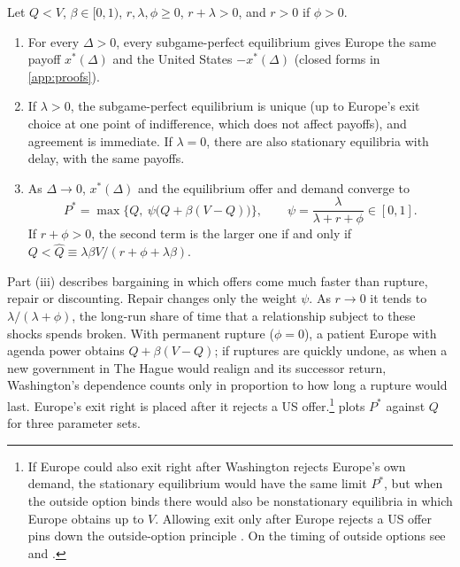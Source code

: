 \begin{proposition}\label{prop:master}
Let $Q<V$, $\beta\in[0,1)$, $r,\lambda,\phi\ge 0$, $r+\lambda>0$, and $r>0$ if $\phi>0$.
\begin{enumerate}[label=(\roman*)]
\item For every $\Delta>0$, every subgame-perfect equilibrium gives Europe the same payoff $x^*(\Delta)$ and the United States $-x^*(\Delta)$ (closed forms in \cref{app:proofs}).
\item If $\lambda>0$, the subgame-perfect equilibrium is unique (up to Europe's exit choice at one point of indifference, which does not affect payoffs), and agreement is immediate. If $\lambda=0$, there are also stationary equilibria with delay, with the same payoffs.
\item As $\Delta\to 0$, $x^*(\Delta)$ and the equilibrium offer and demand converge to
\begin{equation}\label{eq:master}
P^*=\max\big\{Q,\ \psi\big(Q+\beta(V-Q)\big)\big\},\qquad \psi=\frac{\lambda}{\lambda+r+\phi}\in[0,1].
\end{equation}
If $r+\phi>0$, the second term is the larger one if and only if $Q<\hat Q\equiv\lambda\beta V/(r+\phi+\lambda\beta)$.
\end{enumerate}
\end{proposition}

Part (iii) describes bargaining in which offers come much faster than rupture, repair or discounting. Repair changes only the weight $\psi$. As $r\to0$ it tends to $\lambda/(\lambda+\phi)$, the long-run share of time that a relationship subject to these shocks spends broken. With permanent rupture ($\phi=0$), a patient Europe with agenda power obtains $Q+\beta(V-Q)$; if ruptures are quickly undone, as when a new government in The Hague would realign and its successor return, Washington's dependence counts only in proportion to how long a rupture would last. Europe's exit right is placed after it rejects a US offer.\footnote{If Europe could also exit right after Washington rejects Europe's own demand, the stationary equilibrium would have the same limit $P^*$, but when the outside option binds there would also be nonstationary equilibria in which Europe obtains up to $V$. Allowing exit only after Europe rejects a US offer pins down the outside-option principle \citep{binmore1989outside}. On the timing of outside options see \citet{shaked1994opting} and \citet{ponsati1998rubinstein}.}  plots $P^*$ against $Q$ for three parameter sets.

